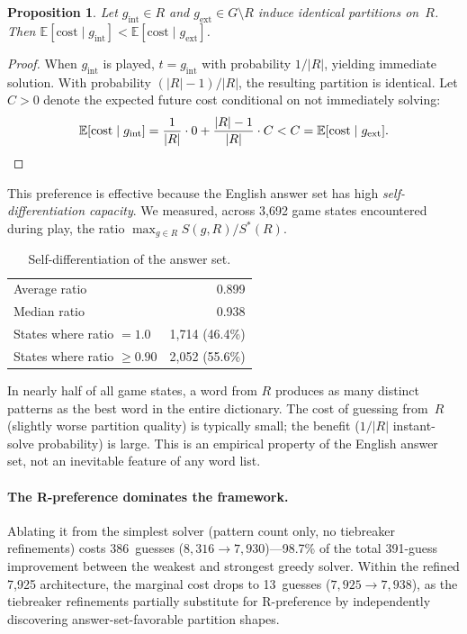 \documentclass[11pt]{article}
\newtheorem{proposition}[theorem]{Proposition}
\begin{document}
	\begin{proposition}\label{prop:rpref}
		Let $g_{\mathrm{int}} \in R$ and $g_{\mathrm{ext}} \in G \setminus R$ induce identical partitions on~$R$.  Then $\mathbb{E}[\mathrm{cost} \mid g_{\mathrm{int}}] < \mathbb{E}[\mathrm{cost} \mid g_{\mathrm{ext}}]$.
	\end{proposition}
	
	\begin{proof}
		When $g_{\mathrm{int}}$ is played, $t = g_{\mathrm{int}}$ with probability $1/|R|$, yielding immediate solution.  With probability $(|R|-1)/|R|$, the resulting partition is identical.  Let $C > 0$ denote the expected future cost conditional on not immediately solving:
		\begin{equation}
			\mathbb{E}[\mathrm{cost} \mid g_{\mathrm{int}}] = \frac{1}{|R|}\cdot 0 + \frac{|R|-1}{|R|}\cdot C < C = \mathbb{E}[\mathrm{cost} \mid g_{\mathrm{ext}}]. \qedhere
		\end{equation}
	\end{proof}
	
	This preference is effective because the English answer set has high \emph{self-differentiation capacity}.  We measured, across 3,692 game states encountered during play, the ratio $\max_{g \in R} S(g,R) / S^*(R)$.
	
	\begin{table}[h]
		\centering
		\caption{Self-differentiation of the answer set.}
		\label{tab:selfdiff}
		\begin{tabular}{@{}lr@{}}
			\toprule
			Average ratio & 0.899 \\
			Median ratio & 0.938 \\
			States where ratio $= 1.0$ & 1,714 (46.4\%) \\
			States where ratio $\geq 0.90$ & 2,052 (55.6\%) \\
			\bottomrule
		\end{tabular}
	\end{table}
	
	In nearly half of all game states, a word from $R$ produces as many distinct patterns as the best word in the entire dictionary.  The cost of guessing from~$R$ (slightly worse partition quality) is typically small; the benefit ($1/|R|$ instant-solve probability) is large.  This is an empirical property of the English answer set, not an inevitable feature of any word list.
	
	\paragraph{The R-preference dominates the framework.}
	Ablating it from the simplest solver (pattern count only, no tiebreaker refinements) costs 386~guesses ($8{,}316 \to 7{,}930$)---98.7\% of the total 391-guess improvement between the weakest and strongest greedy solver.  Within the refined 7,925 architecture, the marginal cost drops to 13~guesses ($7{,}925 \to 7{,}938$), as the tiebreaker refinements partially substitute for R-preference by independently discovering answer-set-favorable partition shapes.
	
\end{document}
